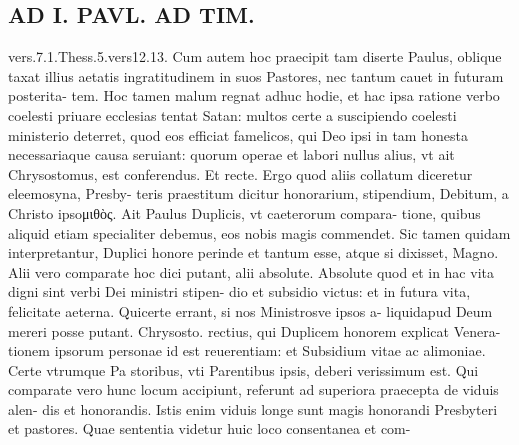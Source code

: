 \documentclass{article}
\begin{document}
\begin{pages}
\section*{AD I. PAVL. AD TIM. }
\marginpar{[ p.306 ]}\pstart vers.7.1.Thess.5.vers12.13. Cum autem hoc praecipit tam diserte Paulus, oblique taxat illius aetatis ingratitudinem in suos Pastores, nec tantum cauet in futuram posterita- tem. Hoc tamen malum regnat adhuc hodie, et hac ipsa ratione verbo coelesti priuare ecclesias tentat Satan: multos certe a suscipiendo coelesti ministerio deterret, quod eos efficiat famelicos, qui Deo ipsi in tam honesta necessariaque causa seruiant: quorum operae et labori nullus alius, vt ait Chrysostomus, est conferendus. Et recte. Ergo quod aliis collatum diceretur eleemosyna, Presby- teris praestitum dicitur honorarium, stipendium, Debitum, a Christo ipsoμιθὸς. Ait Paulus Duplicis, vt caeterorum compara- tione, quibus aliquid etiam specialiter debemus, eos nobis magis commendet. Sic tamen quidam interpretantur, Duplici honore perinde et tantum esse, atque si dixisset, Magno. Alii vero comparate hoc dici putant, alii absolute. Absolute quod et in hac vita digni sint verbi Dei ministri stipen- dio et subsidio victus: et in futura vita, felicitate aeterna. Quicerte errant, si nos Ministrosve ipsos a- liquidapud Deum mereri posse putant. Chrysosto. rectius, qui Duplicem honorem explicat Venera- tionem ipsorum personae id est reuerentiam: et Subsidium vitae ac alimoniae. Certe vtrumque Pa storibus, vti Parentibus ipsis, deberi verissimum est. Qui comparate vero hunc locum accipiunt, referunt ad superiora praecepta de viduis alen- dis et honorandis. Istis enim viduis longe sunt magis honorandi Presbyteri et pastores. Quae sententia videtur huic loco consentanea et com-  \pend

\end{pages}
\end{document}
